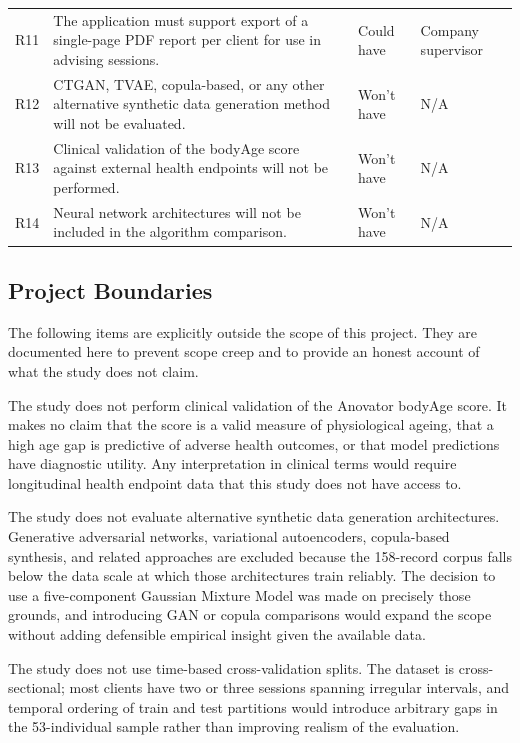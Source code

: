 \documentclass[11pt,a4paper]{article}
\begin{document}
\begin{table}[H]
\begin{tabular}{p{0.5cm} p{7.5cm} p{2.2cm} p{3cm}}
    R11 & The application must support export of a single-page PDF report per client for use in advising sessions. & Could have & Company supervisor \\
    R12 & CTGAN, TVAE, copula-based, or any other alternative synthetic data generation method will not be evaluated. & Won't have & N/A \\
    R13 & Clinical validation of the bodyAge score against external health endpoints will not be performed. & Won't have & N/A \\
    R14 & Neural network architectures will not be included in the algorithm comparison. & Won't have & N/A \\
    \bottomrule
  \end{tabular}
\end{table}

\subsection{Project Boundaries}

The following items are explicitly outside the scope of this project. They are documented here to prevent scope creep and to provide an honest account of what the study does not claim.

The study does not perform clinical validation of the Anovator bodyAge score. It makes no claim that the score is a valid measure of physiological ageing, that a high age gap is predictive of adverse health outcomes, or that model predictions have diagnostic utility. Any interpretation in clinical terms would require longitudinal health endpoint data that this study does not have access to.

The study does not evaluate alternative synthetic data generation architectures. Generative adversarial networks, variational autoencoders, copula-based synthesis, and related approaches are excluded because the 158-record corpus falls below the data scale at which those architectures train reliably. The decision to use a five-component Gaussian Mixture Model was made on precisely those grounds, and introducing GAN or copula comparisons would expand the scope without adding defensible empirical insight given the available data.

The study does not use time-based cross-validation splits. The dataset is cross-sectional; most clients have two or three sessions spanning irregular intervals, and temporal ordering of train and test partitions would introduce arbitrary gaps in the 53-individual sample rather than improving realism of the evaluation.
\end{document}
